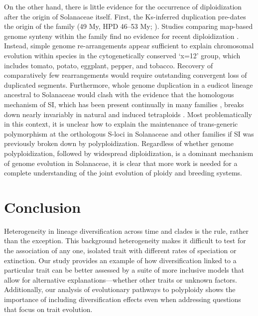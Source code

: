 On the other hand, there is little evidence for the occurrence of diploidization after the origin of Solanaceae itself.
First, the Ks-inferred duplication \citep{tomato2012} pre-dates the origin of the family (49 My, HPD 46--53 My; \citealt{sarkinen_2013}). 
Studies comparing map-based genome synteny within the family find no evidence for recent diploidization \citep{wu_2010a}.
Instead, simple genome re-arrangements appear sufficient to explain chromosomal evolution within species in the cytogenetically conserved `x=12' group, which includes tomato, potato, eggplant, pepper, and tobacco.
Recovery of comparatively few rearrangements would require outstanding convergent loss of duplicated segments.
Furthermore, whole genome duplication in a eudicot lineage ancestral to Solanaceae would clash with the evidence that the homologous mechanism of SI, which has been present continually in many families \citep{igic_2006}, breaks down nearly invariably in natural and induced tetraploids \citep{stone_2002, mcclure_2009}.
Most problematically in this context, it is unclear how to explain the maintenance of trans-generic polymorphism at the orthologous S-loci in Solanaceae and other families if SI was previously broken down by polyploidization.
%
Regardless of whether genome polyploidization, followed by widespread diploidization, is a dominant mechanism of genome evolution in Solanaceae, it is clear that more work is needed for a complete understanding of the joint evolution of ploidy and breeding systems.

\section{Conclusion}

Heterogeneity in lineage diversification across time and clades is the rule, rather than the exception.
This background heterogeneity makes it difficult to test for the association of any one, isolated trait with different rates of speciation or extinction.
Our study provides an example of how diversification linked to a particular trait can be better assessed by a suite of more inclusive models that allow for alternative explanations---whether other traits or unknown factors.
Additionally, our analysis of evolutionary pathways to polyploidy shows the importance of including diversification effects even when addressing questions that focus on trait evolution.
